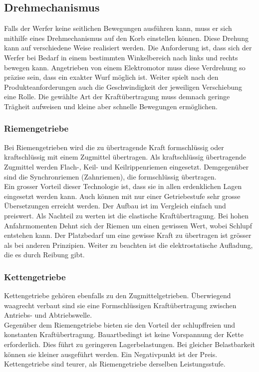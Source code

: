 \subsection{Drehmechanismus}
Falls der Werfer keine seitlichen Bewegungen ausführen kann, muss er sich mithilfe eines Drehmechanismus auf den Korb einstellen können. Diese Drehung kann auf verschiedene Weise realisiert werden. Die Anforderung ist, dass sich der Werfer bei Bedarf in einem bestimmten Winkelbereich nach links und rechts bewegen kann. Angetrieben von einem Elektromotor muss diese Verdrehung so präzise sein, dass ein exakter Wurf möglich ist. Weiter spielt nach den Produkteanforderungen auch die Geschwindigkeit der jeweiligen Verschiebung eine Rolle. Die gewählte Art der Kraftübertragung muss demnach geringe Trägheit aufweisen und kleine aber schnelle Bewegungen ermöglichen. 
\subsubsection{Riemengetriebe}
Bei Riemengetrieben wird die zu übertragende Kraft formschlüssig oder kraftschlüssig mit einem Zugmittel übertragen. Als kraftschlüssig übertragende Zugmittel werden Flach-, Keil- und Keilrippenriemen eingesetzt. Demgegenüber sind die Synchronriemen (Zahnriemen), die formschlüssig übertragen.\\
Ein grosser Vorteil dieser Technologie ist, dass sie in allen erdenklichen Lagen eingesetzt werden kann. Auch können mit nur einer Getriebestufe sehr grosse Übersetzungen erreicht werden. Der Aufbau ist im Vergleich einfach und preiswert. Als Nachteil zu werten ist die elastische Kraftübertragung. Bei hohen Anfahrmomenten Dehnt sich der Riemen um einen gewissen Wert, wobei Schlupf entstehen kann. Der Platzbedarf um eine gewisse Kraft zu übertragen ist grösser als bei anderen Prinzipien. Weiter zu beachten ist die elektrostatische Aufladung, die es durch Reibung gibt. 
\subsubsection{Kettengetriebe}
Kettengetriebe gehören ebenfalls zu den Zugmittelgetrieben. Überwiegend waagrecht verbaut sind sie eine Formschlüssigen Kraftübertragung zwischen Antriebs- und Abtriebswelle.\\ 
Gegenüber dem Riemengetriebe bieten sie den Vorteil der schlupffreien und konstanten Kraftübertragung. Bauartbedingt ist keine Vorspannung der Kette erforderlich. Dies führt zu geringeren Lagerbelastungen. Bei gleicher Belastbarkeit können sie kleiner ausgeführt werden. Ein Negativpunkt ist der Preis. Kettengetriebe sind teurer, als Riemengetriebe derselben Leistungsstufe.
